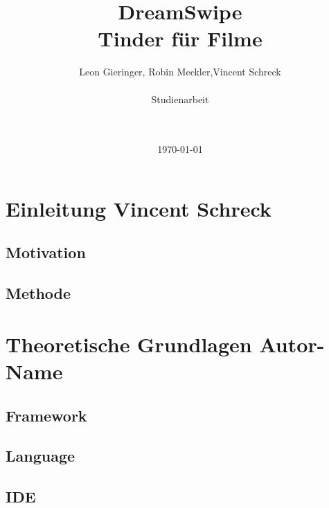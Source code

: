 \documentclass[11pt,a4paper]{article}
\title{DreamSwipe\\Tinder für Filme\vspace{10px}}
\author{Leon Gieringer, Robin Meckler,Vincent Schreck \\ \\ Studienarbeit \\ \\ \\}
\date{\today}
\begin{document}
\maketitle
\thispagestyle{empty}
\newpage
{}
\tableofcontents
\newpage
{}



\pagestyle{fancy}
\fancyhf{}
\setlength{\headheight}{35pt}

\renewcommand\headrulewidth{0.4pt}

\fancyhead[LE,RO]{\rightmark}%
\renewcommand{\sectionmark}[1]{\markright{#1}}
\renewcommand{\subsectionmark}[1]{\markright{#1}}
\renewcommand{\subsubsectionmark}[1]{\markright{#1}}

\cfoot{\thepage}
\newpage


\section[Einleitung]{Einleitung \hfill \normalfont \small{Vincent Schreck}}


\subsection{Motivation}


\subsection{Methode}



\section[Theoretische Grundlagen]{Theoretische Grundlagen \hfill \normalfont \small{Autor-Name}}


\subsection{Framework}
%

\subsection{Language}
%

\subsection{IDE}
%
\end{document}

